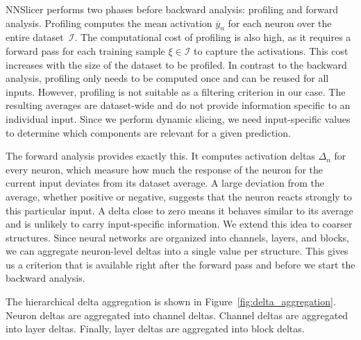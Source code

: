 \documentclass[
12pt,
fancyheadings,
a4paper,
twoside,
BCOR=0.7cm,
nobcorignoretitle,
grayscalebody,
]{stsreprt}
\begin{document}
NNSlicer performs two phases before backward analysis: profiling and forward analysis. 
Profiling computes the mean activation $\bar{y}_n$ for each neuron over the entire
dataset~$\mathcal{I}$.
The computational cost of profiling is also high, as it requires a forward pass for each training
sample $\xi \in \mathcal{I}$ to capture the activations.
This cost increases with the size of the dataset to be profiled.
In contrast to the backward analysis, profiling only needs to be computed once and can be reused
for all inputs.
However, profiling is not suitable as a filtering criterion in our case.
The resulting averages are dataset-wide and do not provide information specific to an individual
input. Since we perform dynamic slicing, we need input-specific values to determine which
components are relevant for a given prediction.

The forward analysis provides exactly this. It computes activation deltas $\Delta_n$ for every
neuron, 
which measure how much the response of the neuron for the current input deviates from its dataset
average.
A large deviation from the average, whether positive or negative, suggests that the neuron reacts
strongly to this particular input.
A delta close to zero means it behaves similar to its average and is unlikely to carry
input-specific information.
We extend this idea to coarser structures.
Since neural networks are organized into channels, layers, and blocks, we can aggregate
neuron-level deltas into a single value per structure.
This gives us a criterion that is available right after the forward pass and before we start the
backward analysis.

The hierarchical delta aggregation is shown in Figure~\ref{fig:delta_aggregation}.
Neuron deltas are aggregated into channel deltas.
Channel deltas are aggregated into layer deltas.
Finally, layer deltas are aggregated into block deltas.
\end{document}
